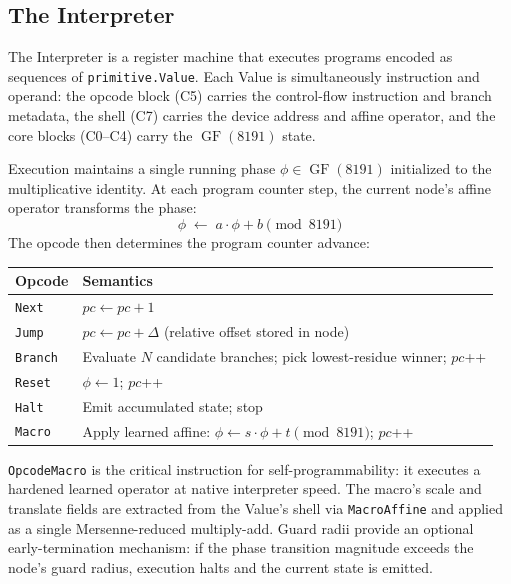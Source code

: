 \subsection{The Interpreter}
\label{sec:interpreter}

The Interpreter is a register machine that executes programs encoded as
sequences of \texttt{primitive.Value}.  Each Value is simultaneously
instruction and operand: the opcode block (C5) carries the control-flow
instruction and branch metadata, the shell (C7) carries the device address
and affine operator, and the core blocks (C0--C4) carry the
$\operatorname{GF}(8191)$ state.

Execution maintains a single running phase $\phi \in \operatorname{GF}(8191)$
initialized to the multiplicative identity.  At each program counter step,
the current node's affine operator transforms the phase:
\begin{equation}
  \phi \;\leftarrow\; a \cdot \phi + b \pmod{8191}
\end{equation}
The opcode then determines the program counter advance:

\begin{center}
\begin{tabular}{ll}
  \toprule
  \textbf{Opcode} & \textbf{Semantics} \\
  \midrule
  \texttt{Next}    & $\mathit{pc} \leftarrow \mathit{pc} + 1$ \\
  \texttt{Jump}    & $\mathit{pc} \leftarrow \mathit{pc} + \Delta$ (relative offset stored in node) \\
  \texttt{Branch}  & Evaluate $N$ candidate branches; pick lowest-residue winner; $\mathit{pc}$++ \\
  \texttt{Reset}   & $\phi \leftarrow 1$;\; $\mathit{pc}$++ \\
  \texttt{Halt}    & Emit accumulated state; stop \\
  \texttt{Macro}   & Apply learned affine: $\phi \leftarrow s \cdot \phi + t \pmod{8191}$;\; $\mathit{pc}$++ \\
  \bottomrule
\end{tabular}
\end{center}

\texttt{OpcodeMacro} is the critical instruction for self-programmability: it
executes a hardened learned operator at native interpreter speed.  The macro's
scale and translate fields are extracted from the Value's shell via
\texttt{MacroAffine} and applied as a single Mersenne-reduced multiply-add.
Guard radii provide an optional early-termination mechanism: if the phase
transition magnitude exceeds the node's guard radius, execution halts and the
current state is emitted.

